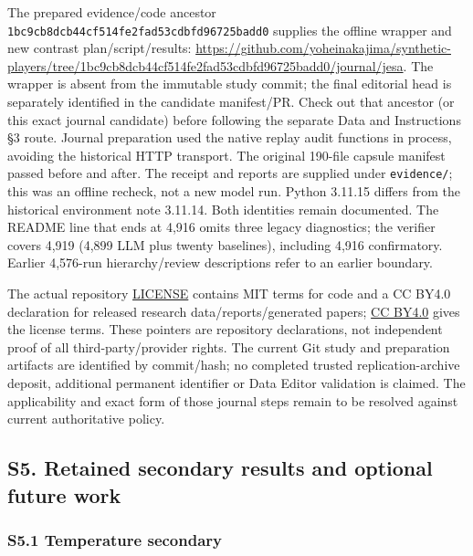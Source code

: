 \documentclass[11pt]{article}
\begin{document}
The prepared evidence/code ancestor
\nolinkurl{1bc9cb8dcb44cf514fe2fad53cdbfd96725badd0} supplies the
offline wrapper and new contrast plan/script/results:
\url{https://github.com/yoheinakajima/synthetic-players/tree/1bc9cb8dcb44cf514fe2fad53cdbfd96725badd0/journal/jesa}.
The wrapper is absent from the immutable study commit; the final
editorial head is separately identified in the candidate manifest/PR.
Check out that ancestor (or this exact journal candidate) before
following the separate Data and Instructions §3 route. Journal
preparation used the native replay audit functions in process, avoiding
the historical HTTP transport. The original 190-file capsule manifest
passed before and after. The receipt and reports are supplied under
\texttt{evidence/}; this was an offline recheck, not a new model run.
Python 3.11.15 differs from the historical environment note 3.11.14.
Both identities remain documented. The README line that ends at 4,916
omits three legacy diagnostics; the verifier covers 4,919 (4,899 LLM
plus twenty baselines), including 4,916 confirmatory. Earlier 4,576-run
hierarchy/review descriptions refer to an earlier boundary.

The actual repository
\href{https://github.com/yoheinakajima/synthetic-players/blob/62ab90beff1d291b069c87f13b6b6b3495171ddd/LICENSE}{LICENSE}
contains MIT terms for code and a CC BY4.0 declaration for released
research data/reports/generated papers;
\href{https://creativecommons.org/licenses/by/4.0/}{CC BY4.0} gives the
license terms. These pointers are repository declarations, not
independent proof of all third-party/provider rights. The current Git
study and preparation artifacts are identified by commit/hash; no
completed trusted replication-archive deposit, additional permanent
identifier or Data Editor validation is claimed. The applicability and
exact form of those journal steps remain to be resolved against current
authoritative policy.

\subsection{S5. Retained secondary results and optional future
work}\label{s5.-retained-secondary-results-and-optional-future-work}

\subsubsection{S5.1 Temperature
secondary}\label{s5.1-temperature-secondary}
\end{document}
